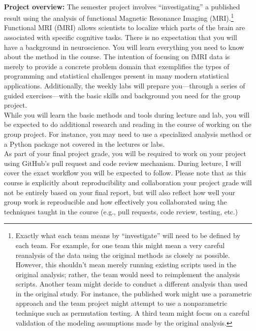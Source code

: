 \documentclass[11pt]{article}
\begin{document}
\textbf {\large \\ Project overview:}
The semester project involves ``investigating'' a published result using the
analysis of functional Magnetic Resonance Imaging (MRI).\footnote{Exactly what
each team means by ``investigate'' will need to be defined by each team.  For
example, for one team this might mean a very careful reanalysis of the data
using the original methods as closely as possible.  However, this shouldn't
mean merely running existing scripts used in the original analysis; rather, the
team would need to reimplement the analysis scripts.  Another team might decide
to conduct a different analysis than used in the original study.  For instance,
the published work might use a parametric approach and the team project might
attempt to use a nonparametric technique such as permutation testing.  A third
team might focus on a careful validation of the modeling assumptions made by
the original analysis.}    Functional MRI (fMRI) allows scientists to localize
which parts of the brain are associated with specific cognitive tasks. There is
no expectation that you will have a background in neuroscience. You will learn
everything you need to know about the method in the course. The intention of
focusing on fMRI data is merely to provide a concrete problem domain that
exemplifies the types of programming and statistical challenges present in many
modern statistical applications.  Additionally, the weekly labs will prepare
you---through a series of guided exercises---with the basic skills and
background you need for the group project.\\

While you will learn the basic methods and tools during lecture and lab, you
will be expected to do additional research and reading in the course of working
on the group project.  For instance, you may need to use a specialized analysis
method or a Python package not covered in the lectures or labs.\\

As part of your final project grade, you will be required to work on your
project using GitHub's pull request and code review mechanism.  During lecture,
I will cover the exact workflow you will be expected to follow.  Please note
that as this course is explicitly about reproducibility and collaboration your
project grade will not be entirely based on your final report, but will also
reflect how well your group work is reproducible and how effectively you
collaborated using the techniques taught in the course (e.g., pull requests,
code review, testing, etc.)
\end{document}
